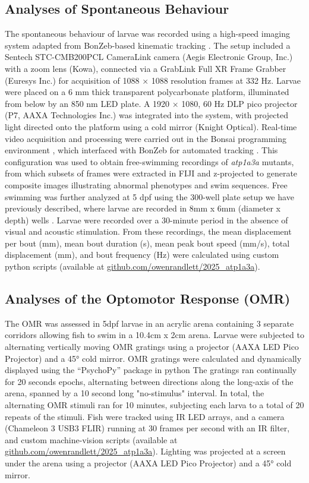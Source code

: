 \documentclass[9.5pt,lineno]{RandlettLab_elife}
\begin{document}
\subsection{Analyses of Spontaneous Behaviour}
The spontaneous behaviour of larvae was recorded using a high-speed imaging system adapted from BonZeb-based kinematic tracking \citep{Guilbeault2021}.
The setup included a Sentech STC-CMB200PCL CameraLink camera (Aegis Electronic Group, Inc.) with a zoom lens (Kowa), connected via a GrabLink Full XR Frame Grabber (Euresys Inc.) for acquisition of 1088 × 1088 resolution frames at 332 Hz.
Larvae were placed on a 6 mm thick transparent polycarbonate platform, illuminated from below by an 850 nm LED plate.
A 1920 × 1080, 60 Hz DLP pico projector (P7, AAXA Technologies Inc.) was integrated into the system, with projected light directed onto the platform using a cold mirror (Knight Optical).
Real-time video acquisition and processing were carried out in the Bonsai programming environment \citep{Lopes2015}, which interfaced with BonZeb for automated tracking \citep{Guilbeault2021}.
This configuration was used to obtain free-swimming recordings of \emph{atp1a3a} mutants, from which subsets of frames were extracted in FIJI and z-projected to generate composite images illustrating abnormal phenotypes and swim sequences.
Free swimming was further analyzed at 5 dpf using the 300-well plate setup we have previously described, where larvae are recorded in 8mm x 6mm (diameter x depth) wells \citep{Lamire2023-he}. 
Larvae were recorded over a 30-minute period in the absence of visual and acoustic stimulation.
From these recordings, the mean displacement per bout (mm), mean bout duration (s), mean peak bout speed (mm/s), total displacement (mm), and bout frequency (Hz) were calculated using custom python scripts (available at \href{https://github.com/owenrandlett/2025_atp1a3a}{github.com/owenrandlett/2025\_atp1a3a}).

\subsection{Analyses of the Optomotor Response (OMR)}

The OMR was assessed in 5dpf larvae in an acrylic arena containing 3 separate corridors allowing fish to swim in a 10.4cm x 2cm arena.
Larvae were subjected to alternating vertically moving OMR gratings using a projector (AAXA LED Pico Projector) and a 45° cold mirror.
OMR gratings were calculated and dynamically displayed using the “PsychoPy” package in python \citep{Peirce2007}
The gratings ran continually for 20 seconds epochs, alternating between directions along the long-axis of the arena, spanned by a 10 second long "no-stimulus" interval.
In total, the alternating OMR stimuli ran for 10 minutes, subjecting each larva to a total of 20 repeats of the stimuli.
Fish were tracked using IR LED arrays, and a camera (Chameleon 3 USB3 FLIR) running at 30 frames per second with an IR filter, and custom machine-vision scripts (available at \href{https://github.com/owenrandlett/2025_atp1a3a}{github.com/owenrandlett/2025\_atp1a3a}).
Lighting was projected at a screen under the arena using a projector (AAXA LED Pico Projector) and a 45° cold mirror.
\end{document}

